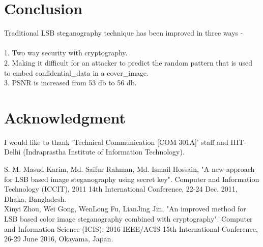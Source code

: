 \documentclass[conference]{IEEEtran}
\begin{document}
\section{Conclusion}
Traditional LSB steganography technique has been improved in three ways -\\ \\
1. Two way security with cryptography.\\
2. Making it difficult for an attacker to predict the random pattern that is used to embed confidential\_data in a cover\_image.\\
3. PSNR is increased from 53 db to 56 db.\\
\section*{Acknowledgment}
I would like to thank 'Technical Communication [COM 301A]' staff and IIIT-Delhi (Indraprastha Institute of Information Technology).\\

\begin{thebibliography}{00}
 S. M. Masud Karim, Md. Saifur Rahman, Md. Ismail Hossain, "A new approach for LSB based image steganography using secret key".  Computer and Information Technology (ICCIT), 2011 14th International Conference, 22-24 Dec. 2011, Dhaka, Bangladesh.\\
 Xinyi Zhou, Wei Gong, WenLong Fu, LianJing Jin, "An improved method for LSB based color image steganography combined with cryptography". Computer and Information Science (ICIS), 2016 IEEE/ACIS 15th International Conference, 26-29 June 2016, Okayama, Japan.\\
\end{thebibliography}
\end{document}
